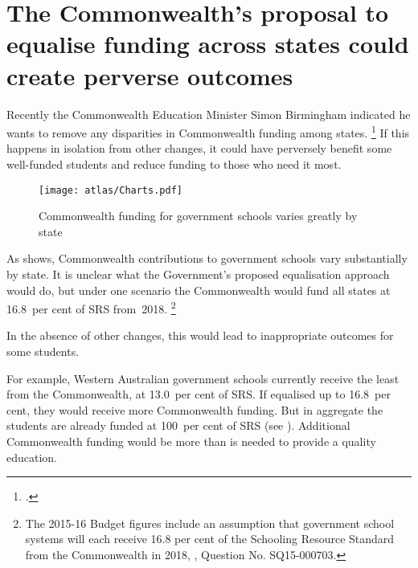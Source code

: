 \documentclass{grattan}
\begin{document}
\section{The Commonwealth's proposal to equalise funding across states could create perverse outcomes}\label{sec:equalise-funding-across-states}
Recently the Commonwealth Education Minister Simon Birmingham indicated he wants to remove any disparities in Commonwealth funding among states.%
\footcite{Balogh2016WildInequalityGonski}
If this happens in isolation from other changes, it could have perversely benefit some well-funded students and reduce funding to those who need it most.

\begin{figure}
\caption{Commonwealth funding for government schools varies greatly by state}\label{fig:funding-is-highly-variable-by-sector-and-state}


\texttt{[image: atlas/Charts.pdf]}
\end{figure}

As  shows, Commonwealth contributions to government schools vary substantially by state. It is unclear what the \mbox{Government's} proposed equalisation approach would do, but under one scenario the Commonwealth would fund all states at 16.8~per cent of SRS from~2018.%
\footnote{The 2015-16 Budget figures include an assumption that government school systems will each receive 16.8 per cent of the Schooling Resource Standard from the Commonwealth in 2018, \textcite{SenateSQ15000703}, Question No. SQ15-000703.}

In the absence of other changes, this would lead to inappropriate outcomes for some students.

For example, Western Australian government schools currently receive the least from the Commonwealth, at 13.0~per cent of SRS\@. If equalised up to 16.8~per cent, they would receive more Commonwealth funding. But in aggregate the students are already funded at 100~per cent of SRS (see ). Additional Commonwealth funding would be more than is needed to provide a quality education.
\end{document}
